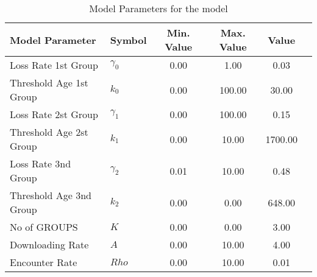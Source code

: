\begin{table}
\centering
\begin{tabular}{p{5cm}lcccc}
{\bf Model Parameter} & {\bf Symbol} & {\bf Min. Value} & {\bf Max. Value} & {\bf Value}\\
\hline\hline
Loss Rate 1st Group & $\gamma_0$ & 0.00 & 1.00 & 0.03\\
Threshold Age 1st Group & $k_0$ & 0.00 & 100.00 & 30.00\\
Loss Rate 2st Group & $\gamma_1$ & 0.00 & 100.00 & 0.15\\
Threshold Age 2st Group & $k_1$ & 0.00 & 10.00 & 1700.00\\
Loss Rate 3nd Group & $\gamma_2$ & 0.01 & 10.00 & 0.48\\
Threshold Age 3nd Group & $k_2$ & 0.00 & 0.00 & 648.00\\
No of GROUPS & $K$ & 0.00 & 0.00 & 3.00\\
Downloading Rate & $A$ & 0.00 & 10.00 & 4.00\\
Encounter Rate & $Rho$ & 0.00 & 10.00 & 0.01\\
\hline\hline
\end{tabular}
\caption{Model Parameters for the model}
\end{table}
